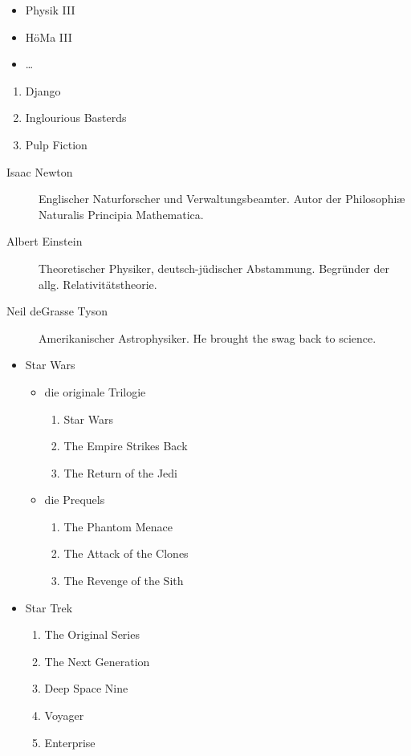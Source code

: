 \documentclass{scrartcl}
\begin{document}
\begin{itemize}
  \item Physik III
  \item HöMa III
  \item …
\end{itemize}

\begin{enumerate}
  \item Django
  \item Inglourious Basterds
  \item Pulp Fiction
\end{enumerate}

\begin{description}
  \item[Isaac Newton] Englischer Naturforscher und Verwaltungsbeamter.
    Autor der Philosophiæ Naturalis Principia Mathematica.
  \item[Albert Einstein] Theoretischer Physiker, deutsch-jüdischer Abstammung.
    Begründer der allg. Relativitätstheorie.
  \item[Neil deGrasse Tyson] Amerikanischer Astrophysiker.
    He brought the swag back to science.
\end{description}

\begin{itemize}
  \item Star Wars
    \begin{itemize}
      \item die originale Trilogie
        \begin{enumerate}
          \item Star Wars
          \item The Empire Strikes Back
          \item The Return of the Jedi
        \end{enumerate}
      \item die Prequels
        \begin{enumerate}
          \item The Phantom Menace
          \item The Attack of the Clones
          \item The Revenge of the Sith
        \end{enumerate}
    \end{itemize}
  \item Star Trek
    \begin{enumerate}
      \item The Original Series
      \item The Next Generation
      \item Deep Space Nine
      \item Voyager
      \item Enterprise
    \end{enumerate}
\end{itemize}
\end{document}
